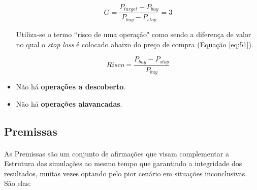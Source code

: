 \begin{itemize}
    \begin{equation} \label{eq:50}
        G = \dfrac{P_{target} - P_{buy}}{P_{buy} - P_{stop}} = 3
    \end{equation}

    Utiliza-se o termo ``risco de uma operação" como sendo a diferença de valor no qual o \textit{stop loss} é colocado abaixo do preço de compra (Equação \ref{eq:51}).

    \begin{equation} \label{eq:51}
        Risco = \dfrac{P_{buy} - P_{stop}}{P_{buy}}
    \end{equation}

    \item Não há \textbf{operações a descoberto}.
    \item Não há \textbf{operações alavancadas}.

\end{itemize}



\subsection{Premissas}

\paragraph{} As Premissas são um conjunto de afirmações que visam complementar a Estrutura das simulações ao mesmo tempo que garantindo a integridade dos resultados, muitas vezes optando pelo pior cenário em situações inconclusivas. São elas:

